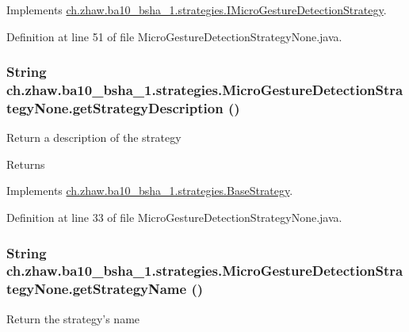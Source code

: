 Implements \hyperlink{interfacech_1_1zhaw_1_1ba10__bsha__1_1_1strategies_1_1IMicroGestureDetectionStrategy_a8593331fb67e5d4dc890d3db9f2d1b58}{ch.zhaw.ba10\_\-bsha\_\-1.strategies.IMicroGestureDetectionStrategy}.

Definition at line 51 of file MicroGestureDetectionStrategyNone.java.\hypertarget{classch_1_1zhaw_1_1ba10__bsha__1_1_1strategies_1_1MicroGestureDetectionStrategyNone_ad6f173fc0670d819bfa82551fc9775f5}{
\subsubsection[{getStrategyDescription}]{\setlength{\rightskip}{0pt plus 5cm}String ch.zhaw.ba10\_\-bsha\_\-1.strategies.MicroGestureDetectionStrategyNone.getStrategyDescription ()}}
\label{classch_1_1zhaw_1_1ba10__bsha__1_1_1strategies_1_1MicroGestureDetectionStrategyNone_ad6f173fc0670d819bfa82551fc9775f5}
Return a description of the strategy

\begin{DoxyReturn}{Returns}

\end{DoxyReturn}


Implements \hyperlink{classch_1_1zhaw_1_1ba10__bsha__1_1_1strategies_1_1BaseStrategy_a75fdb36932ad701f6375cc1fe718056b}{ch.zhaw.ba10\_\-bsha\_\-1.strategies.BaseStrategy}.

Definition at line 33 of file MicroGestureDetectionStrategyNone.java.\hypertarget{classch_1_1zhaw_1_1ba10__bsha__1_1_1strategies_1_1MicroGestureDetectionStrategyNone_a2e46564a49ac92530fc648e3149d5ee4}{
\subsubsection[{getStrategyName}]{\setlength{\rightskip}{0pt plus 5cm}String ch.zhaw.ba10\_\-bsha\_\-1.strategies.MicroGestureDetectionStrategyNone.getStrategyName ()}}
\label{classch_1_1zhaw_1_1ba10__bsha__1_1_1strategies_1_1MicroGestureDetectionStrategyNone_a2e46564a49ac92530fc648e3149d5ee4}
Return the strategy's name

